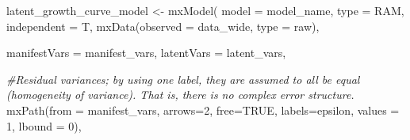 \documentclass[
12pt, %
twoside,
english]{guelphthesis}
\newenvironment{Shaded}{\begin{snugshade}}{\end{snugshade}}
\newcommand{\AttributeTok}[1]{\textcolor[rgb]{0.77,0.63,0.00}{#1}}
\newcommand{\CommentTok}[1]{\textcolor[rgb]{0.56,0.35,0.01}{\textit{#1}}}
\newcommand{\ConstantTok}[1]{\textcolor[rgb]{0.00,0.00,0.00}{#1}}
\newcommand{\DecValTok}[1]{\textcolor[rgb]{0.00,0.00,0.81}{#1}}
\newcommand{\FunctionTok}[1]{\textcolor[rgb]{0.00,0.00,0.00}{#1}}
\newcommand{\NormalTok}[1]{#1}
\newcommand{\OtherTok}[1]{\textcolor[rgb]{0.56,0.35,0.01}{#1}}
\newcommand{\StringTok}[1]{\textcolor[rgb]{0.31,0.60,0.02}{#1}}
\begin{document}
\begin{Shaded}
\begin{Highlighting}[numbers=left,,]
\NormalTok{latent\_growth\_curve\_model }\OtherTok{\textless{}{-}} \FunctionTok{mxModel}\NormalTok{(}
  \AttributeTok{model =}\NormalTok{ model\_name,}
  \AttributeTok{type =} \StringTok{\textquotesingle{}RAM\textquotesingle{}}\NormalTok{, }\AttributeTok{independent =}\NormalTok{ T,}
  \FunctionTok{mxData}\NormalTok{(}\AttributeTok{observed =}\NormalTok{ data\_wide, }\AttributeTok{type =} \StringTok{\textquotesingle{}raw\textquotesingle{}}\NormalTok{),}
  
  \AttributeTok{manifestVars =}\NormalTok{ manifest\_vars,}
  \AttributeTok{latentVars =}\NormalTok{ latent\_vars,}
  
  \CommentTok{\#Residual variances; by using one label, they are assumed to all be equal (homogeneity of variance). That is, there is no complex error structure. }
  \FunctionTok{mxPath}\NormalTok{(}\AttributeTok{from =}\NormalTok{ manifest\_vars,}
         \AttributeTok{arrows=}\DecValTok{2}\NormalTok{, }\AttributeTok{free=}\ConstantTok{TRUE}\NormalTok{,  }\AttributeTok{labels=}\StringTok{\textquotesingle{}epsilon\textquotesingle{}}\NormalTok{, }\AttributeTok{values =} \DecValTok{1}\NormalTok{, }\AttributeTok{lbound =} \DecValTok{0}\NormalTok{),}
  

\end{Highlighting}
\end{Shaded}
\end{document}
